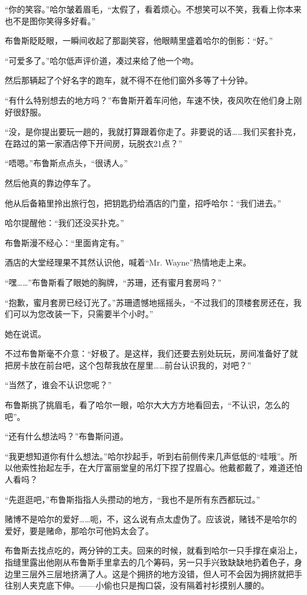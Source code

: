 \documentclass[../main]{subfiles}
\begin{document}
“你的笑容。”哈尔皱着眉毛，“太假了，看着烦心。不想笑可以不笑，我看上你本来也不是图你笑得多好看。”

布鲁斯眨眨眼，一瞬间收起了那副笑容，他眼睛里盛着哈尔的倒影：“好。”

“可爱多了。”哈尔低声评价道，凑过来给了他一个吻。

然后那辆起了个好名字的跑车，就不得不在他们窗外多等了十分钟。

“有什么特别想去的地方吗？”布鲁斯开着车问他，车速不快，夜风吹在他们身上刚好很舒服。

“没，是你提出要玩一趟的，我就打算跟着你走了。非要说的话……我们买套扑克，在路过的第一家酒店停下开间房，玩脱衣21点？”

“唔嗯。”布鲁斯点点头，“很诱人。”

然后他真的靠边停车了。

他从后备箱里拎出旅行包，把钥匙扔给酒店的门童，招呼哈尔：“我们进去。”

哈尔提醒他：“我们还没买扑克。”

布鲁斯漫不经心：“里面肯定有。”

酒店的大堂经理果不其然认识他，喊着“Mr. Wayne”热情地走上来。

“嘿\ldots\ldots”布鲁斯看了眼她的胸牌，“苏珊，还有蜜月套房吗？”

“抱歉，蜜月套房已经订光了。”苏珊遗憾地摇摇头，“不过我们的顶楼套房还在，我们可以为您改装一下，只需要半个小时。”

她在说谎。

不过布鲁斯毫不介意：“好极了。是这样，我们还要去别处玩玩，房间准备好了就把房卡放在前台吧，这个包帮我放在屋里……前台认识我的，对吧？”

“当然了，谁会不认识您呢？”

布鲁斯挑了挑眉毛，看了哈尔一眼，哈尔大大方方地看回去，“不认识，怎么的吧”。

“还有什么想法吗？”布鲁斯问道。

“我更想知道你有什么想法。”哈尔抄起手，听到右前侧传来几声低低的“哇哦”。所以他索性抬起左手，在大厅富丽堂皇的吊灯下捏了捏眉心。他戴都戴了，难道还怕人看吗？

“先逛逛吧，”布鲁斯指指人头攒动的地方，“我也不是所有东西都玩过。”

赌博不是哈尔的爱好……呃，不，这么说有点太虚伪了。应该说，赌钱不是哈尔的爱好，要是赌命，那哈尔可他妈太会了。

布鲁斯去找点吃的，两分钟的工夫。回来的时候，就看到哈尔一只手撑在桌沿上，指缝里露出他刚从布鲁斯手里拿去的几个筹码，另一只手兴致缺缺地扔着色子，身边里三层外三层地挤满了人。这是个拥挤的地方没错，但人可不会因为拥挤就把手往别人夹克底下伸。——小偷也只是掏口袋，没有隔着衬衫摸别人腰的。
\end{document}
